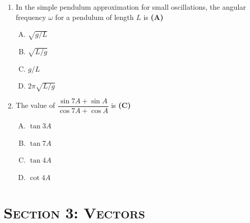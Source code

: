 \documentclass[10pt,a4paper]{article}
\newcommand{\topic}[1]{\section*{\large\textsc{#1}}}
\begin{document}
\begin{enumerate}[1.]
\item In the simple pendulum approximation for small oscillations, the angular frequency $\omega$ for a pendulum of length $L$ is \hfill \textbf{(A)}
\begin{enumerate}[(A)]
    \item $\sqrt{g/L}$
    \item $\sqrt{L/g}$
    \item $g/L$
    \item $2\pi\sqrt{L/g}$
\end{enumerate}

\item The value of $\dfrac{\sin 7A + \sin A}{\cos 7A + \cos A}$ is \hfill \textbf{(C)}
\begin{enumerate}[(A)]
    \item $\tan 3A$
    \item $\tan 7A$
    \item $\tan 4A$
    \item $\cot 4A$
\end{enumerate}

\end{enumerate}

\newpage
\topic{Section 3: Vectors}
\end{document}
